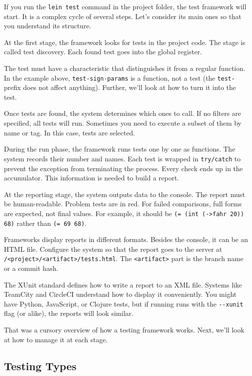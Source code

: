 If you run the \verb|lein test| command in the project folder, the test framework will start. It is a complex cycle of several steps. Let's consider its main ones so that you understand its structure.

At the first stage, the framework looks for tests in the project code. The stage is called test discovery. Each found test goes into the global register.

The test must have a characteristic that distinguishes it from a regular function. In the example above, \verb|test-sign-params| is a function, not a test (the \verb|test-| prefix does not affect anything). Further, we'll look at how to turn it into the test.

Once tests are found, the system determines which ones to call. If no filters are specified, all tests will run. Sometimes you need to execute a subset of them by name or tag. In this case, tests are selected.

During the run phase, the framework runs tests one by one as functions. The system records their number and names. Each test is wrapped in \verb|try/catch| to prevent the exception from terminating the process. Every check ends up in the accumulator. This information is needed to build a report.

At the reporting stage, the system outputs data to the console. The report must be human-readable. Problem tests are in red. For failed comparisons, full forms are expected, not final values. For example, it should be \verb|(= (int (->fahr 20)) 68)| rather than \verb|(= 69 68)|.

Frameworks display reports in different formats. Besides the console, it can be an HTML file. Configure the system so that the report goes to the server at \texttt{/<project>/<arti\-fact>/tests.html}. The \verb|<artifact>| part is the branch name or a commit hash.

The XUnit standard defines how to write a report to an XML file. Systems like TeamCity and CircleCI understand how to display it conveniently. You might have Python, JavaScript, or Clojure tests, but if running runs with the \verb|--xunit| flag (or alike), the reports will look similar.

That was a cursory overview of how a testing framework works. Next, we'll look at how to manage it at each stage.

\subsection{Testing Types}

